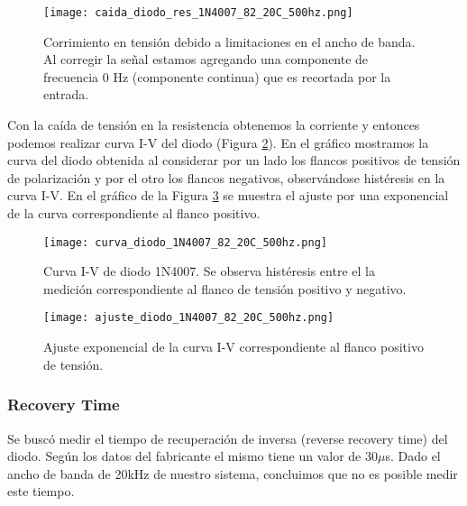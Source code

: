 \documentclass[a4paper, 11pt]{article}
\begin{document}
\begin{figure} [H]
\centering
\texttt{[image: caida\_diodo\_res\_1N4007\_82\_20C\_500hz.png]}
\caption{Corrimiento en tensión debido a limitaciones en el ancho de banda. Al corregir la señal estamos agregando una componente de frecuencia 0 Hz (componente continua) que es recortada por la entrada. \label{fig:caida_diodo_res_1N4007_82_20C_500hz}}
\end{figure} 

Con la caída de tensión en la resistencia obtenemos la corriente y entonces podemos realizar curva I-V del diodo (Figura \ref{fig:curva_diodo_1N4007_82_20C_500hz}). En el gráfico mostramos la curva del diodo obtenida al considerar por un lado los flancos positivos de tensión de polarización y por el otro los flancos negativos, observándose histéresis en la curva I-V. En el gráfico de la Figura \ref{fig:ajuste_diodo_1N4007_82_20C_500hz} se muestra el ajuste por una exponencial de la curva correspondiente al flanco positivo.

\begin{figure} [H]
\centering
\texttt{[image: curva\_diodo\_1N4007\_82\_20C\_500hz.png]}
\caption{Curva I-V de diodo 1N4007. Se observa histéresis entre el la medición correspondiente al flanco de tensión positivo y negativo. \label{fig:curva_diodo_1N4007_82_20C_500hz}}
\end{figure} 

\begin{figure} [H]
\centering
\texttt{[image: ajuste\_diodo\_1N4007\_82\_20C\_500hz.png]}
\caption{Ajuste exponencial de la curva I-V correspondiente al flanco positivo de tensión. \label{fig:ajuste_diodo_1N4007_82_20C_500hz}}
\end{figure} 

 
\subsubsection*{Recovery Time}
Se buscó medir el tiempo de recuperación de inversa (reverse recovery time) del diodo. Según los datos del fabricante el mismo tiene un valor de 30$\mu$s. Dado el ancho de banda de 20kHz de nuestro sistema, concluimos que no es posible medir este tiempo.

\end{document}
